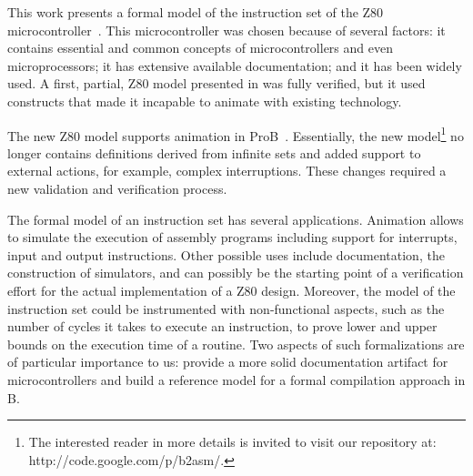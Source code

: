 \documentclass[a4paper]{llncs}
\begin{document}
This work presents a formal model of the instruction set of the Z80
microcontroller~\cite{Z80_manual}. This microcontroller was chosen
because of several factors: it contains essential and common concepts
of microcontrollers and even microprocessors; it has extensive
available documentation; and it has been widely used.  A first,
partial, Z80 model presented in \cite{Valerio_SBMF09} was fully
verified, but it used constructs that made it incapable to animate 
with existing technology. %

The new Z80 model supports animation in ProB~\cite{proB}.  Essentially, the
new model\footnote{The interested reader in more details is invited to visit
our repository at: http://code.google.com/p/b2asm/.} no longer contains
definitions derived from infinite sets and added support to external actions, 
for example, complex interruptions. These changes required a new validation
and verification process.


The formal model of an instruction set has several
applications. Animation allows to simulate the execution of assembly
programs including support for interrupts, input and output
instructions. Other possible uses include documentation, the
construction of simulators, and can possibly be the starting point of
a verification effort for the actual implementation of a Z80
design. Moreover, the model of the instruction set could be
instrumented with non-functional aspects, such as the number of cycles
it takes to execute an instruction, to prove lower and upper bounds on
the execution time of a routine.  Two aspects of such formalizations
are of particular importance to us: provide a more solid documentation
artifact for microcontrollers and build a reference model for a formal
compilation approach in B.
\end{document}
